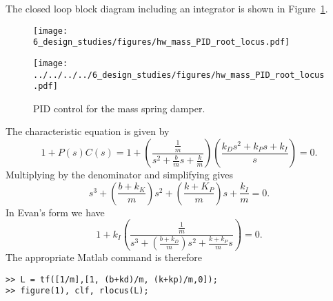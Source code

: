
The closed loop block diagram including an integrator is shown in Figure~\ref{fig:hw_mass_PID_root_locus}.
\begin{figure}[htbp]
   \centering
   \ifsolutionmanual
   
   \texttt{[image: 6\_design\_studies/figures/hw\_mass\_PID\_root\_locus.pdf]}
   
   \else
   \texttt{[image: ../../../../6\_design\_studies/figures/hw\_mass\_PID\_root\_locus.pdf]}

   
   \fi
   \caption{PID control for the mass spring damper.}
   \label{fig:hw_mass_PID_root_locus}
\end{figure}
The characteristic equation is given by
\[
1+P(s)C(s) = 1+\left(\frac{\frac{1}{m}}{s^2+\frac{b}{m}s+\frac{k}{m}}\right)\left(\frac{k_Ds^2+k_Ps+k_I}{s}\right) = 0.
\]
Multiplying by the denominator and simplifying gives
\[
s^3+\left(\frac{b+k_K}{m}\right)s^2 + \left(\frac{k+K_P}{m}\right)s + \frac{k_I}{m} = 0.
\]
In Evan's form we have
\[
1 + k_I\left(\frac{\frac{1}{m}}{s^3 + \left(\frac{b+k_D}{m}\right)s^2 + \frac{k+k_P}{m}s}\right) = 0.
\]
The appropriate Matlab command is therefore
\begin{lstlisting}
>> L = tf([1/m],[1, (b+kd)/m, (k+kp)/m,0]);
>> figure(1), clf, rlocus(L);
\end{lstlisting}
